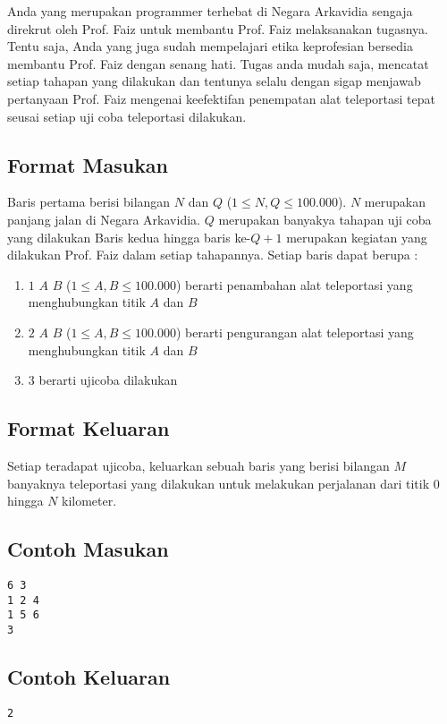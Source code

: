 \documentclass{article}
\begin{document}
Anda yang merupakan programmer terhebat di Negara Arkavidia sengaja direkrut oleh Prof. Faiz untuk membantu Prof. Faiz melaksanakan tugasnya. Tentu saja, Anda yang juga sudah mempelajari etika keprofesian bersedia membantu Prof. Faiz dengan senang hati. Tugas anda mudah saja, mencatat setiap tahapan yang dilakukan dan tentunya selalu dengan sigap menjawab pertanyaan Prof. Faiz mengenai keefektifan penempatan alat teleportasi tepat seusai setiap uji coba teleportasi dilakukan.

\subsection*{Format Masukan}
Baris pertama berisi bilangan $N$ dan $Q$ ($1 \leq N, Q \leq 100.000$). $N$ merupakan panjang jalan di Negara Arkavidia. $Q$ merupakan banyakya tahapan uji coba yang dilakukan
Baris kedua hingga baris ke-$Q+1$ merupakan kegiatan yang dilakukan Prof. Faiz dalam setiap tahapannya. Setiap baris dapat berupa :
\begin{enumerate}
    \setlength\itemsep{0pt}
    \item $1$ $A$ $B$ ($1 \leq A, B \leq 100.000$) berarti penambahan alat teleportasi yang menghubungkan titik $A$ dan $B$
    \item $2$ $A$ $B$ ($1 \leq A, B \leq 100.000$) berarti pengurangan alat teleportasi yang menghubungkan titik $A$ dan $B$
    \item $3$ berarti ujicoba dilakukan    
\end{enumerate}


\subsection*{Format Keluaran}
Setiap teradapat ujicoba, keluarkan sebuah baris yang berisi bilangan $M$ banyaknya teleportasi yang dilakukan untuk melakukan perjalanan dari titik $0$ hingga $N$ kilometer. 
\\

\begin{multicols}{2}
\subsection*{Contoh Masukan}
\begin{lstlisting}
6 3
1 2 4
1 5 6
3
\end{lstlisting}
\columnbreak
\subsection*{Contoh Keluaran}
\begin{lstlisting}
2
\end{lstlisting}
\vfill
\null
\end{multicols}
\end{document}
